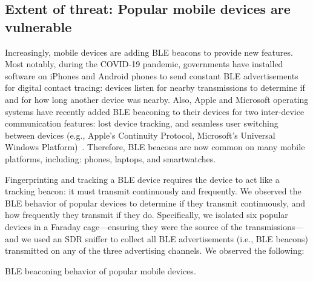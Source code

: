 \subsection{Extent of threat: Popular mobile devices are vulnerable} %

Increasingly,  mobile devices are adding BLE beacons to
provide new features.
%
Most notably, during the COVID-19 pandemic, governments have installed software
on iPhones and Android phones to send constant BLE advertisements for digital
contact tracing: devices listen for nearby transmissions to determine if and
for how long another device was nearby.
%
Also, Apple and Microsoft operating systems have recently added BLE beaconing
to their devices for two inter-device communication features: lost device
tracking, and seamless user switching between devices (e.g., Apple's Continuity
Protocol, Microsoft's Universal Windows
Platform)~\cite{Iphonetracking_becker}.
%
Therefore, BLE beacons are now common on many mobile platforms, including:
phones, laptops, and smartwatches. 
 
 
%

Fingerprinting and tracking a BLE device requires the device to act like a
tracking beacon: it must transmit continuously and frequently.
%
%
We observed the BLE behavior of popular devices to determine if they transmit
continuously, and how frequently they transmit if they do.
%
Specifically, we isolated six popular devices in a Faraday
cage---ensuring they were the source of the transmissions---and we used an SDR sniffer
to collect all BLE advertisements (i.e., BLE beacons) transmitted on any of the three advertising channels. 
%
We observed the following:

\begin{table}
    \centering\small
      \captionsetup{justification=centering}
      \caption{BLE beaconing behavior of popular mobile devices.}
    
    
    \label{tab:beacon_rate}
\end{table}

